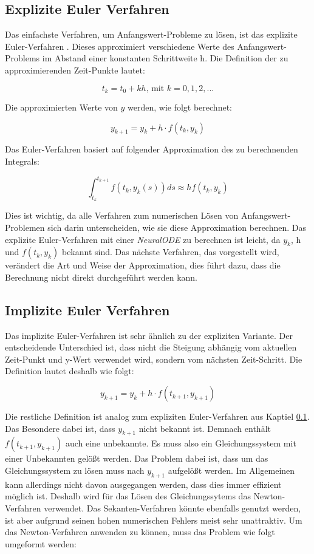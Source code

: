 \subsection{Explizite Euler Verfahren} \label{sec:explizites_euler_verfahren}


Das einfachste Verfahren, um Anfangswert-Probleme zu lösen, ist das explizite Euler-Verfahren \cite[Kapitel~II.1]{ode1}.
Dieses approximiert verschiedene Werte des Anfangswert-Problems 
im Abstand einer konstanten Schrittweite h.
Die Definition der zu approximierenden Zeit-Punkte lautet:

$$
t_k = t_0 + kh \text{, mit } k = 0, 1, 2, ...
$$

Die approximierten Werte von $y$ werden, wie folgt berechnet:

$$
y_{k + 1} = y_{k} + h \cdot f(t_k, y_k)
$$

Das Euler-Verfahren basiert auf folgender Approximation des zu berechnenden Integrals:

$$
\int_{t_k}^{t_{k+1}} f(t_k, y_k(s)) ds \approx h f(t_k, y_k)
$$

Dies ist wichtig, da alle Verfahren zum numerischen Lösen von Anfangswert-Problemen sich darin unterscheiden, wie sie diese Approximation berechnen.
Das explizite Euler-Verfahren mit einer \textit{NeuralODE} zu berechnen
ist leicht, da $y_k$, h und $f(t_k, y_k)$ bekannt sind.
Das nächste Verfahren, das vorgestellt wird, verändert die Art und Weise der Approximation, dies führt dazu, dass die Berechnung nicht direkt durchgeführt werden kann.

\subsection{Implizite Euler Verfahren}

Das implizite Euler-Verfahren  \cite[Kapitel~II.7]{ode1} ist sehr ähnlich zu der expliziten Variante.
Der entscheidende Unterschied ist, dass nicht die Steigung abhängig vom aktuellen 
Zeit-Punkt und y-Wert verwendet wird, sondern vom nächsten Zeit-Schritt.
Die Definition lautet deshalb wie folgt:

$$
y_{k + 1} = y_k + h \cdot f(t_{k + 1}, y_{k + 1})
$$

Die restliche Definition ist analog zum expliziten Euler-Verfahren aus Kaptiel \ref{sec:explizites_euler_verfahren}.
Das Besondere dabei ist, dass $y_{k + 1}$ nicht bekannt ist.
Demnach enthält $f(t_{k + 1}, y_{k + 1})$ auch eine unbekannte.
Es muss also ein Gleichungssystem mit einer Unbekannten gelößt werden.
Das Problem dabei ist, dass um das Gleichungssystem zu lösen muss nach $y_{k + 1}$ aufgelößt werden.
Im Allgemeinen kann allerdings nicht davon ausgegangen werden, dass dies immer effizient möglich ist.
Deshalb wird für das Lösen des Gleichungssytems das Newton-Verfahren \cite[Kapitel~5.5]{intorduction_to_numerical_analysis} verwendet.
Das Sekanten-Verfahren könnte ebenfalls genutzt werden, ist aber aufgrund seinen hohen numerischen 
Fehlers meist sehr unattraktiv.
Um das Newton-Verfahren anwenden zu können, muss das Problem wie folgt umgeformt werden:

